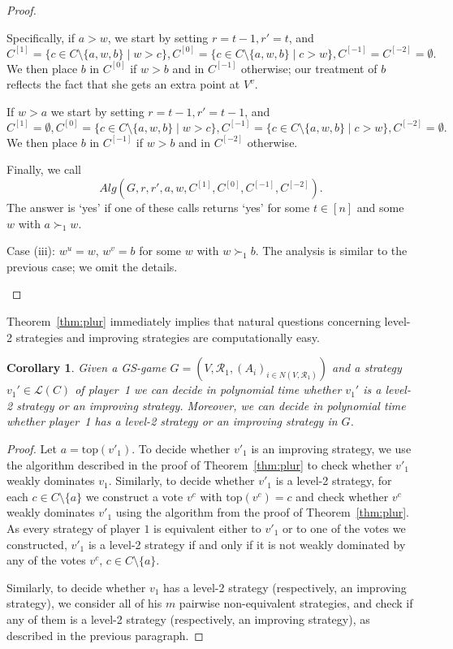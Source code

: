 \documentclass[11pt]{article}
\newtheorem{corollary}[theorem]{Corollary}
\newcommand{\calR}{\mathcal{R}}
\newcommand{\calL}{\mathcal{L}}
\newcommand{\calA}{\mathit{Alg}}
\newcommand{\tp}{\mathrm{top}}
\begin{document}
\begin{proof}
\begin{description}
Specifically, if $a>w$, we start by setting $r =t-1, r'=t$, and
$$  
C^{[1]} =  \{c\in C\setminus\{a, w, b\}\mid w>c\}, 
C^{[0]} = \{c\in C\setminus\{a, w, b\}\mid c>w\}, 
C^{[-1]} = C^{[-2]} = \emptyset.
$$
We then place $b$ in $C^{[0]}$ if $w>b$ and in $C^{[-1]}$ otherwise;
our treatment of $b$ reflects the fact that she gets an extra point at $V^v$.

If $w>a$ we start by setting $r=t-1, r'=t-1$, and
$$
C^{[1]} =  \emptyset,  
C^{[0]} = \{c\in C\setminus\{a, w, b\}\mid w>c\},
C^{[-1]} = \{c\in C\setminus\{a, w, b\}\mid c>w\},
C^{[-2]} = \emptyset.
$$
We then place $b$ in $C^{[-1]}$ if $w>b$ and in $C^{[-2]}$ otherwise.

Finally, we call
$$
\calA(G, r, r', a, w, C^{[1]}, C^{[0]}, C^{[-1]}, C^{[-2]}).
$$
The answer is `yes' if one of these calls returns `yes' for some $t\in [n]$
and some $w$ with $a\succ_1 w$.

\item
Case (iii): $w^u=w$, $w^v=b$ for some $w$ with $w\succ_1 b$.
The analysis is similar to the previous case; we omit the details.\qedhere
\end{description}
\end{proof}

Theorem~\ref{thm:plur} immediately implies that natural questions concerning level-2 strategies 
and improving strategies are computationally easy.

\begin{corollary}\label{cor:lev2}
Given a GS-game $G=(V, \calR_1, (A_i)_{i\in N(V, \calR_1)})$
and a strategy $v_1'\in \calL(C)$ of player~1 we can decide in polynomial time
whether $v_1'$ is a level-2 strategy or an improving strategy. Moreover, we can decide in polynomial
time whether player~1 has a level-2 strategy or an improving strategy in $G$.
\end{corollary}
\begin{proof}
Let $a=\tp(v'_1)$.
To decide whether $v'_1$ is an improving strategy, we use the algorithm 
described in the proof of Theorem~\ref{thm:plur} to check whether $v'_1$ weakly dominates $v_1$.
Similarly, to decide whether $v'_1$ is a level-2 strategy, for each $c\in C\setminus\{a\}$
we construct a vote $v^c$ with $\tp(v^c)=c$ and check whether $v^c$
weakly dominates $v'_1$ using the algorithm from the proof of Theorem~\ref{thm:plur}. 
As every strategy of player $1$ is equivalent either to $v'_1$ or to one of the votes we constructed, 
$v'_1$ is a level-2 strategy if and only if it is not weakly dominated by any of the votes
$v^c$, $c\in C\setminus\{a\}$.

Similarly, to decide whether $v_1$ has a level-2 strategy (respectively, an improving strategy), 
we consider all of his $m$ pairwise non-equivalent strategies, and check if any of them is a level-2 strategy
(respectively, an improving strategy), as described in the previous paragraph. 
\end{proof}
\end{document}
